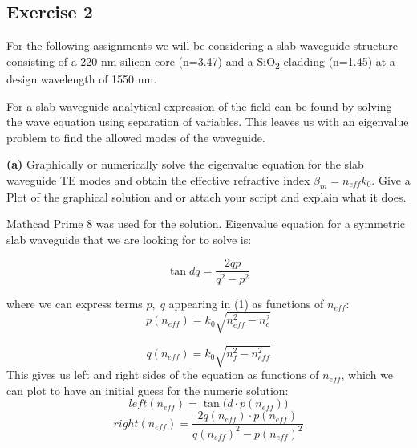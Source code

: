 \documentclass[11pt,a4paper]{article}
\begin{document}
\setcounter{equation}{0}
\subsection*{Exercise 2}

For the following assignments we will be considering a slab waveguide structure consisting of a 220 nm silicon core (n=3.47) and a SiO\textsubscript{2} cladding (n=1.45) at a design wavelength of 1550 nm.


For a slab waveguide analytical expression of the field can be found by solving the wave equation using separation of variables. This leaves us with an eigenvalue problem to find the allowed modes of the waveguide.

\begin{displayquote}
   \textbf{(a)} Graphically or numerically solve the eigenvalue equation for the slab waveguide TE modes and obtain the effective refractive index $\beta_m=n_{eff}k_0$. Give a Plot of the graphical solution and or attach your script and explain what it does. 
\end{displayquote}

Mathcad Prime 8 was used for the solution. Eigenvalue equation for a symmetric slab waveguide that we are looking for to solve is: 

\begin{equation}
    \tan{dq}=\frac{2qp}{q^2-p^2}
\end{equation}

where we can express terms $p, \; q$ appearing in (1) as functions of $n_{eff}$:
\begin{equation*}
    p(n_{eff})=k_0\sqrt{n_{eff}^2-n_c^2}
\end{equation*}

\begin{equation*}
    q(n_{eff})=k_0\sqrt{n_{f}^2-n_{eff}^2}
\end{equation*}
This gives us left and right sides of the equation as functions of $n_{eff}$, which we can plot to have an initial guess for the numeric solution:
\begin{equation*}
    left(n_{eff})=\tan{(d\cdot{p(n_{eff}))}}
\end{equation*}
\begin{equation*}
    right(n_{eff})=\frac{2q(n_{eff})\cdot{p(n_{eff})}}{q(n_{eff})^2-p(n_{eff})^2}
\end{equation*}
\end{document}
